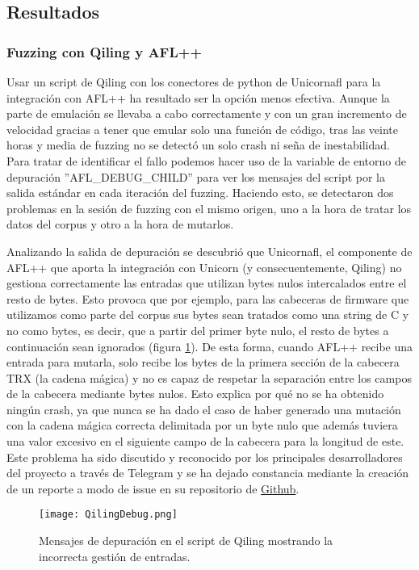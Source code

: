 \subsection{Resultados}
\subsubsection{Fuzzing con Qiling y AFL++}
Usar un script de Qiling con los conectores de python de Unicornafl para la integración con AFL++ ha resultado ser la opción menos efectiva. 
Aunque la parte de emulación se llevaba a cabo correctamente y con un gran incremento de velocidad gracias a tener que emular solo una función de 
código, tras las veinte horas y media de fuzzing no se detectó un solo crash ni seña de inestabilidad. Para tratar de identificar el fallo podemos hacer 
uso de la variable de entorno de depuración ''AFL\_DEBUG\_CHILD'' para ver los mensajes del script por la salida estándar en cada iteración del fuzzing. Haciendo esto, se detectaron dos 
problemas en la sesión de fuzzing con el mismo origen, uno a la hora de tratar los datos del corpus y otro a la hora de mutarlos.\bigskip

Analizando la salida de depuración se descubrió que Unicornafl, el componente de AFL++ que 
aporta la integración con Unicorn (y consecuentemente, Qiling) no gestiona correctamente las entradas que utilizan bytes nulos intercalados 
entre el resto de bytes. Esto provoca que por ejemplo, para las cabeceras de firmware que utilizamos como parte del corpus sus bytes sean 
tratados como una string de C y no como bytes, es decir, que a partir del primer byte nulo, el resto de bytes a continuación sean ignorados 
(figura \ref{fig:QilingDebug}). De esta forma, cuando AFL++ recibe una entrada para mutarla, solo recibe los bytes de la primera sección 
de la cabecera TRX (la cadena mágica) y no es capaz 
de respetar la separación entre los campos de la cabecera mediante bytes nulos. Esto explica por qué no se ha obtenido ningún crash, ya que 
nunca se ha dado el caso de haber generado una mutación con la cadena mágica correcta delimitada por un byte nulo que además tuviera una valor 
excesivo en el siguiente campo de la cabecera para la longitud de este. Este problema ha sido discutido y reconocido por los principales 
desarrolladores del proyecto a través de Telegram y se ha dejado constancia mediante la creación de un reporte a modo de issue en su repositorio
de \href{https://github.com/AFLplusplus/unicornafl/issues/13}{Github}. 
\begin{figure}[H]
    \centering
    \texttt{[image: QilingDebug.png]}
    \caption{Mensajes de depuración en el script de Qiling mostrando la incorrecta gestión de entradas.}
    \label{fig:QilingDebug}
\end{figure}

